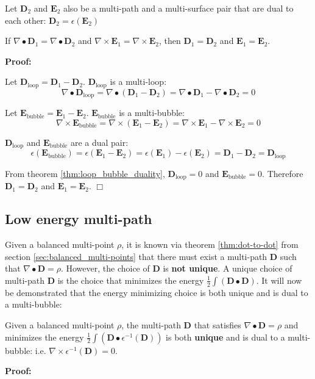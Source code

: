 Let \(\mathbf{D}_2\) and \(\mathbf{E}_2\) also be a multi-path and a multi-surface pair that are dual to each other: \(\mathbf{D}_2 = \epsilon(\mathbf{E}_2)\)

If \(\nabla \bullet \mathbf{D}_1 = \nabla \bullet \mathbf{D}_2\) and \(\nabla \times \mathbf{E}_1 = \nabla \times \mathbf{E}_2\), then \(\mathbf{D}_1 = \mathbf{D}_2\) and \(\mathbf{E}_1 = \mathbf{E}_2\).   

\textbf{Proof:}

Let \(\mathbf{D}_{\text{loop}} = \mathbf{D}_1 - \mathbf{D}_2\). \(\mathbf{D}_{\text{loop}}\) is a multi-loop:
\[\nabla \bullet \mathbf{D}_{\text{loop}} = \nabla \bullet (\mathbf{D}_1 - \mathbf{D}_2) = \nabla \bullet \mathbf{D}_1 - \nabla \bullet \mathbf{D}_2 = 0\]

Let \(\mathbf{E}_{\text{bubble}} = \mathbf{E}_1 - \mathbf{E}_2\). \(\mathbf{E}_{\text{bubble}}\) is a multi-bubble: 
\[\nabla \times \mathbf{E}_{\text{bubble}} = \nabla \times (\mathbf{E}_1 - \mathbf{E}_2) = \nabla \times \mathbf{E}_1 - \nabla \times \mathbf{E}_2 = 0\]

\(\mathbf{D}_{\text{loop}}\) and \(\mathbf{E}_{\text{bubble}}\) are a dual pair:
\[\epsilon(\mathbf{E}_{\text{bubble}}) = \epsilon(\mathbf{E}_1 - \mathbf{E}_2) = \epsilon(\mathbf{E}_1) - \epsilon(\mathbf{E}_2) = \mathbf{D}_1 - \mathbf{D}_2 = \mathbf{D}_{\text{loop}}\]

From theorem \ref{thm:loop_bubble_duality}, \(\mathbf{D}_{\text{loop}} = 0\) and \(\mathbf{E}_{\text{bubble}} = 0\). Therefore \(\mathbf{D}_1 = \mathbf{D}_2\) and \(\mathbf{E}_1 = \mathbf{E}_2\). \(\Box\)



\subsection{Low energy multi-path}

Given a balanced multi-point \(\rho\), it is known via theorem \ref{thm:dot-to-dot} from section \ref{sec:balanced_multi-points} that there must exist a multi-path \(\mathbf{D}\) such that \(\nabla \bullet \mathbf{D} = \rho\). However, the choice of \(\mathbf{D}\) is {\bf not unique}. A unique choice of multi-path \(\mathbf{D}\) is the choice that minimizes the energy \(\frac{1}{2}\int (\mathbf{D} \bullet \mathbf{D})\). It will now be demonstrated that the energy minimizing choice is both unique and is dual to a multi-bubble:

\begin{thm}\label{thm:low_energy_path}
Given a balanced multi-point \(\rho\), the multi-path \(\mathbf{D}\) that satisfies \(\nabla \bullet \mathbf{D} = \rho\) and minimizes the energy \(\frac{1}{2}\int (\mathbf{D} \bullet \epsilon^{-1}(\mathbf{D}))\) is both {\bf unique} and is dual to a multi-bubble: i.e. \(\nabla \times \epsilon^{-1}(\mathbf{D}) = 0\). 
\end{thm}
\textbf{Proof:}

